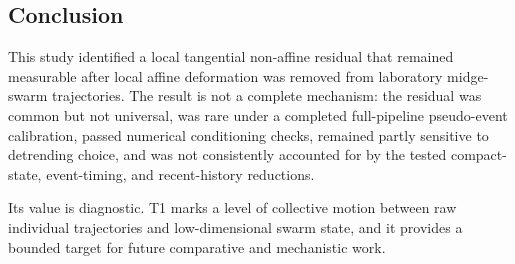 \subsection{Conclusion}

This study identified a local tangential non-affine residual that remained
measurable after local affine deformation was removed from laboratory
midge-swarm trajectories. The result is not a complete mechanism: the residual
was common but not universal, was rare under a completed full-pipeline
pseudo-event calibration, passed numerical conditioning checks, remained
partly sensitive to detrending choice, and was not consistently accounted for
by the tested compact-state, event-timing, and recent-history reductions.

Its value is diagnostic. T1 marks a level of collective motion between raw
individual trajectories and low-dimensional swarm state, and it provides a
bounded target for future comparative and mechanistic work.
